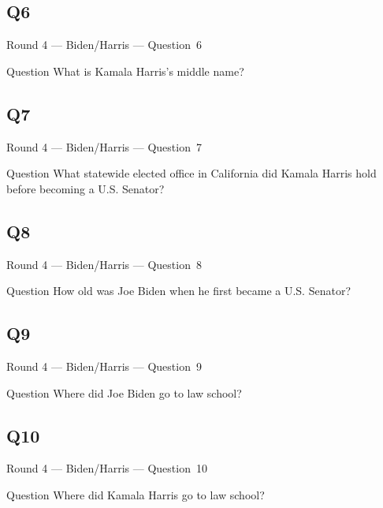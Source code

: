 \documentclass[11pt]{beamer}
\begin{document}
\subsection*{Q6}
\begin{frame}[t]{Round 4 --- Biden/Harris --- \mbox{Question 6}}
\vspace{-0.5em}
\begin{block}{Question}
What is Kamala Harris's middle name?
\end{block}
\end{frame}
\subsection*{Q7}
\begin{frame}[t]{Round 4 --- Biden/Harris --- \mbox{Question 7}}
\vspace{-0.5em}
\begin{block}{Question}
What statewide elected office in California did Kamala Harris hold before becoming a U.S. Senator?
\end{block}
\end{frame}
\subsection*{Q8}
\begin{frame}[t]{Round 4 --- Biden/Harris --- \mbox{Question 8}}
\vspace{-0.5em}
\begin{block}{Question}
How old was Joe Biden when he first became a U.S. Senator?
\end{block}
\end{frame}
\subsection*{Q9}
\begin{frame}[t]{Round 4 --- Biden/Harris --- \mbox{Question 9}}
\vspace{-0.5em}
\begin{block}{Question}
Where did Joe Biden go to law school?
\end{block}
\end{frame}
\subsection*{Q10}
\begin{frame}[t]{Round 4 --- Biden/Harris --- \mbox{Question 10}}
\vspace{-0.5em}
\begin{block}{Question}
Where did Kamala Harris go to law school?
\end{block}
\end{frame}
\end{document}
